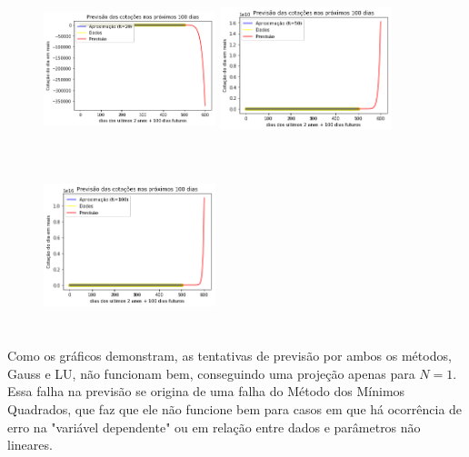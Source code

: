 \documentclass{article}
\begin{document}
\begin{figure}[!htb]
\includegraphics [width=5cm,height=5cm]{PrevisaoLU/P20.png}
\includegraphics [width=5cm,height=5cm]{PrevisaoLU/P50.png}
\includegraphics [width=5cm,height=5cm]{PrevisaoLU/P100.png}
\end{figure}

\newpage

\text Como os gráficos demonstram, as tentativas de previsão por ambos os métodos, Gauss e LU, não funcionam bem, conseguindo uma projeção apenas para $N = 1$. Essa falha na previsão se origina de uma falha do Método dos Mínimos Quadrados, que faz que ele não funcione bem para casos em que há ocorrência de erro na "variável dependente" ou em relação entre dados e parâmetros não lineares. 
\end{document}
